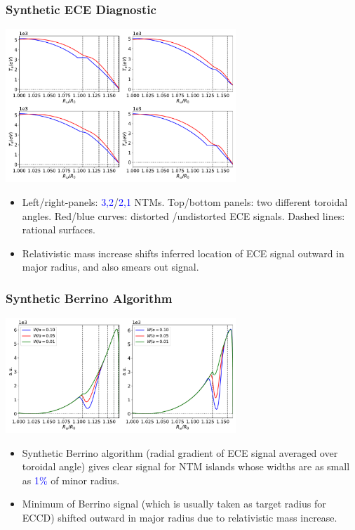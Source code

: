 \documentclass{beamer}
\begin{document}
\begin{frame}
\frametitle{Synthetic ECE Diagnostic}
 
 \begin{center}
\includegraphics[width=0.65\textwidth]{../Fig16.pdf}
\end{center}

\begin{itemize}
\item Left/right-panels: \textcolor{blue}{3,2}/\textcolor{blue}{2,1} NTMs. Top/bottom panels: two different toroidal angles. Red/blue curves: distorted /undistorted ECE signals. Dashed lines: rational surfaces. 
\item Relativistic mass increase shifts inferred location of ECE signal outward in major radius, and also smears out signal. 
\end{itemize}
 \end{frame}
 
\begin{frame}
\frametitle{Synthetic Berrino Algorithm}
 
\begin{center}
\includegraphics[width=0.65\textwidth]{../Fig17.pdf}
\end{center}

\begin{itemize}
\item Synthetic Berrino algorithm (radial gradient of ECE signal averaged over toroidal angle) gives clear signal for NTM islands whose widths are as small as \textcolor{blue}{1\%} of minor radius. 
\item Minimum of Berrino signal (which is usually taken as target radius for ECCD) shifted outward in major radius due to relativistic mass increase. 
\end{itemize}

\end{frame}
\end{document}
